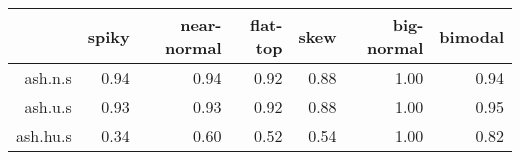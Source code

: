 \begin{tabular}{rrrrrrr}
  \toprule  & spiky & near-normal & flat-top & skew & big-normal & bimodal \\ 
  \midrule ash.n.s & 0.94 & 0.94 & 0.92 & 0.88 & 1.00 & 0.94 \\ 
  ash.u.s & 0.93 & 0.93 & 0.92 & 0.88 & 1.00 & 0.95 \\ 
  ash.hu.s & 0.34 & 0.60 & 0.52 & 0.54 & 1.00 & 0.82 \\ 
   \bottomrule \end{tabular}

